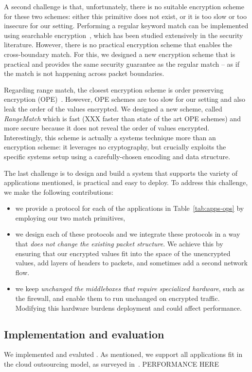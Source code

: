 A second challenge is that, unfortunately, there is no suitable encryption scheme for these two schemes: either this primitive does not exist, or it is too slow or too insecure for our setting. Performing a regular keyword match can be implemented using searchable encryption~\cite{song, blindbox, X}, which has been studied extensively in the security literature.
However, there is no practical encryption scheme that enables the cross-boundary match. 
For this, we designed a new encryption scheme that is practical and provides the same security guarantee as the regular match -- as if the match is not happening across packet boundaries. 

Regarding range match, the closest encryption scheme is order preserving encryption (OPE)~\cite{mope, BCLO}. However, OPE schemes are too slow for our setting and also leak the order of the values encrypted. We designed a new scheme, called {\em RangeMatch} which is fast (XXX faster than state of the art OPE schemes) and more secure because it does not reveal the order of values encrypted. Interestingly, this scheme is actually a systems technique more than an encryption scheme: it leverages no cryptography, but crucially  exploits the specific systems setup using a carefully-chosen encoding and data structure.

The last challenge is to design and build a system that supports the variety of applications mentioned, is practical and easy to deploy. 
To address this challenge, we make the following contributions:
\begin{itemize}
\item we provide a  protocol for each of the applications in Table~\ref{tab:apps-ops} by employing our two match  primitives,
\item we design each of these protocols and we integrate these protocols in a way that {\em does not change the existing packet structure}. We achieve this by ensuring that our encrypted values fit into the space of the unencrypted values, add layers of headers to packets, and sometimes add a second network flow.
\item  we keep {\em unchanged  the middleboxes that require specialized hardware}, such as the firewall, and enable them to run unchanged on encrypted traffic. Modifying this hardware burdens deployment and could affect performance. 
\end{itemize}


\subsection{Implementation and evaluation}

We implemented and evaluted \sys. As mentioned, we support all applications fit in the cloud outsourcing model, as surveyed in~\cite{aplomb}. PERFORMANCE HERE
